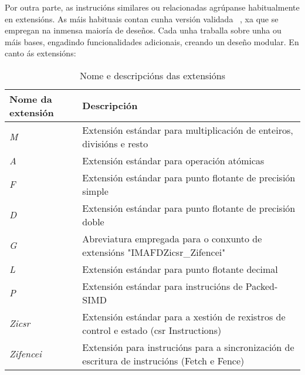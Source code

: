 Por outra parte, as instrucións similares ou relacionadas agrúpanse habitualmente en extensións. As máis habituais contan cunha versión validada ~\cite{ratified_extensions}, xa que se empregan na inmensa maioría de deseños. Cada unha traballa sobre unha ou máis bases, engadindo funcionalidades adicionais, creando un deseño modular. 
En canto ás extensións: 

\begin{table}[hp!]
  \centering
  \begin{tabular}{|p{5cm}|p{7cm}|}
    \rowcolor{udcpink!25}
    \textbf{Nome da extensión} & \textbf{Descripción} \\\hline
    \textit{M} & Extensión estándar para multiplicación de enteiros, divisións e resto \\
    \textit{A} & Extensión estándar para operación atómicas \\
    \textit{F} & Extensión estándar para punto flotante de precisión simple \\
    \textit{D} & Extensión estándar para punto flotante de precisión doble \\
    \textit{G} & Abreviatura empregada para o conxunto de extensións "IMAFDZicsr\_Zifencei" \\
    \textit{L} & Extensión estándar para punto flotante decimal \\
    \textit{P} & Extensión estándar para instrucións de Packed-SIMD \\
    \textit{Zicsr} & Extensión estándar para a xestión de rexistros de control e estado (\acrfull{csr} Instructions) \\
    \textit{Zifencei} &  Extensión para instrucións para a sincronización de escritura de instrucións (Fetch e Fence) \\
  \end{tabular}
  \caption{Nome e descripcións das extensións}
  \label{tab:extensiones}
\end{table}


